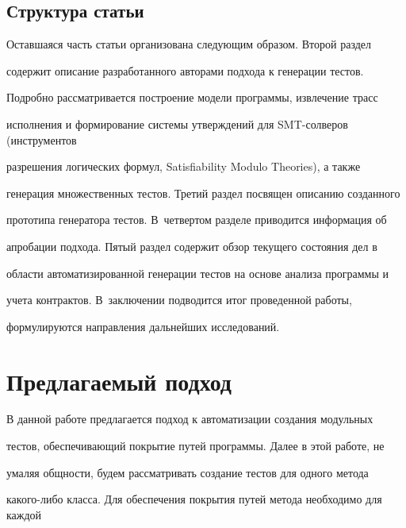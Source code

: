       \subsection{Структура статьи}





     Оставшаяся часть статьи организована следующим образом. Второй раздел


содержит описание разработанного авторами подхода к генерации тестов.


Подробно рассматривается построение модели программы, извлечение трасс


исполнения и формирование системы утверждений для SMT-солверов (инструментов 


разрешения логических формул, Satisfiability Modulo Theories), а также


генерация множественных тестов. Третий раздел посвящен описанию созданного


прототипа генератора тестов. В~четвертом разделе приводится информация об


апробации подхода. Пятый раздел содержит обзор текущего состояния дел в


области автоматизированной генерации тестов на основе анализа программы и


учета контрактов. В~заключении подводится итог проведенной работы,


формулируются направления дальнейших исследований.










      \section{Предлагаемый подход}





     В данной работе предлагается подход к автоматизации создания модульных


тестов, обеспечивающий покрытие путей программы. Далее в этой работе, не


умаляя общности, будем рассматривать создание тестов для одного метода


ка\-ко\-го-ли\-бо класса. Для обеспечения покрытия путей метода необходимо для каждой


